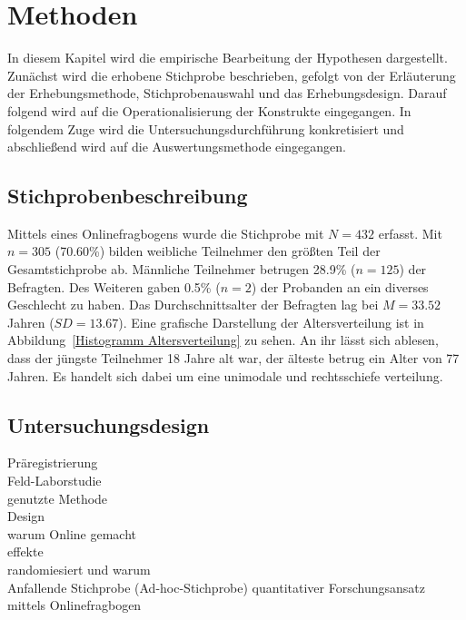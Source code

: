 \chapter{Methoden}   \label{ch_3}
In diesem Kapitel wird die empirische Bearbeitung der Hypothesen dargestellt. Zunächst wird die erhobene Stichprobe beschrieben, gefolgt von der Erläuterung der Erhebungsmethode, Stichprobenauswahl und das Erhebungsdesign. Darauf folgend wird auf die Operationalisierung der Konstrukte eingegangen. In folgendem Zuge wird die Untersuchungsdurchführung konkretisiert und abschließend wird auf die Auswertungsmethode eingegangen.

\section{Stichprobenbeschreibung} \label{sec_3.1}
Mittels eines Onlinefragbogens wurde die Stichprobe mit $N = 432$ erfasst. Mit $n = 305$ (70.60\%) bilden weibliche Teilnehmer den größten Teil der Gesamtstichprobe ab. Männliche Teilnehmer betrugen 28.9\% ($n = 125$) der Befragten. Des Weiteren gaben 0.5\% ($n = 2$) der Probanden an ein diverses Geschlecht zu haben. Das Durchschnittsalter der Befragten lag bei $M = 33.52$ Jahren ($SD = 13.67$). Eine grafische Darstellung der Altersverteilung ist in Abbildung~\ref{Histogramm Altersverteilung} zu sehen. An ihr lässt sich ablesen, dass der jüngste Teilnehmer 18 Jahre alt war, der älteste betrug ein Alter von 77 Jahren. Es handelt sich dabei um eine unimodale und rechtsschiefe verteilung. 



\section{Untersuchungsdesign}  \label{sec_3.2}
Präregistrierung \\ %
Feld-Laborstudie\\
genutzte Methode \\
Design \\
warum Online gemacht \\
effekte\\
randomiesiert und warum \\
Anfallende Stichprobe (Ad-hoc-Stichprobe)
quantitativer Forschungsansatz mittels Onlinefragbogen



